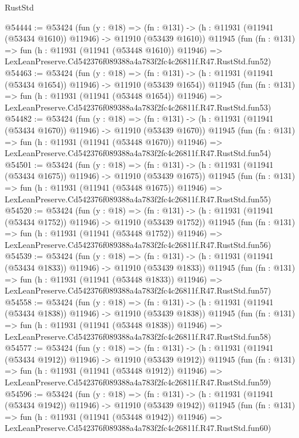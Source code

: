 \begin{lexlean}{RustStd}
\begin{coremodule}
@54444 := @53424
    (fun (y : @18) =>
    (fn : @131) -> (h : @11931 (@11941 (@53434 @1610)) @11946) -> @11910 (@53439 @1610))
    @11945
    (fun (fn : @131) =>
    fun (h : @11931 (@11941 (@53448 @1610)) @11946) =>
    LexLeanPreserve.Cd542376f089388a4a783f2fc4c26811f.R47.RustStd.fun52)
@54463 := @53424
    (fun (y : @18) =>
    (fn : @131) -> (h : @11931 (@11941 (@53434 @1654)) @11946) -> @11910 (@53439 @1654))
    @11945
    (fun (fn : @131) =>
    fun (h : @11931 (@11941 (@53448 @1654)) @11946) =>
    LexLeanPreserve.Cd542376f089388a4a783f2fc4c26811f.R47.RustStd.fun53)
@54482 := @53424
    (fun (y : @18) =>
    (fn : @131) -> (h : @11931 (@11941 (@53434 @1670)) @11946) -> @11910 (@53439 @1670))
    @11945
    (fun (fn : @131) =>
    fun (h : @11931 (@11941 (@53448 @1670)) @11946) =>
    LexLeanPreserve.Cd542376f089388a4a783f2fc4c26811f.R47.RustStd.fun54)
@54501 := @53424
    (fun (y : @18) =>
    (fn : @131) -> (h : @11931 (@11941 (@53434 @1675)) @11946) -> @11910 (@53439 @1675))
    @11945
    (fun (fn : @131) =>
    fun (h : @11931 (@11941 (@53448 @1675)) @11946) =>
    LexLeanPreserve.Cd542376f089388a4a783f2fc4c26811f.R47.RustStd.fun55)
@54520 := @53424
    (fun (y : @18) =>
    (fn : @131) -> (h : @11931 (@11941 (@53434 @1752)) @11946) -> @11910 (@53439 @1752))
    @11945
    (fun (fn : @131) =>
    fun (h : @11931 (@11941 (@53448 @1752)) @11946) =>
    LexLeanPreserve.Cd542376f089388a4a783f2fc4c26811f.R47.RustStd.fun56)
@54539 := @53424
    (fun (y : @18) =>
    (fn : @131) -> (h : @11931 (@11941 (@53434 @1833)) @11946) -> @11910 (@53439 @1833))
    @11945
    (fun (fn : @131) =>
    fun (h : @11931 (@11941 (@53448 @1833)) @11946) =>
    LexLeanPreserve.Cd542376f089388a4a783f2fc4c26811f.R47.RustStd.fun57)
@54558 := @53424
    (fun (y : @18) =>
    (fn : @131) -> (h : @11931 (@11941 (@53434 @1838)) @11946) -> @11910 (@53439 @1838))
    @11945
    (fun (fn : @131) =>
    fun (h : @11931 (@11941 (@53448 @1838)) @11946) =>
    LexLeanPreserve.Cd542376f089388a4a783f2fc4c26811f.R47.RustStd.fun58)
@54577 := @53424
    (fun (y : @18) =>
    (fn : @131) -> (h : @11931 (@11941 (@53434 @1912)) @11946) -> @11910 (@53439 @1912))
    @11945
    (fun (fn : @131) =>
    fun (h : @11931 (@11941 (@53448 @1912)) @11946) =>
    LexLeanPreserve.Cd542376f089388a4a783f2fc4c26811f.R47.RustStd.fun59)
@54596 := @53424
    (fun (y : @18) =>
    (fn : @131) -> (h : @11931 (@11941 (@53434 @1942)) @11946) -> @11910 (@53439 @1942))
    @11945
    (fun (fn : @131) =>
    fun (h : @11931 (@11941 (@53448 @1942)) @11946) =>
    LexLeanPreserve.Cd542376f089388a4a783f2fc4c26811f.R47.RustStd.fun60)

\end{coremodule}
\end{lexlean}
